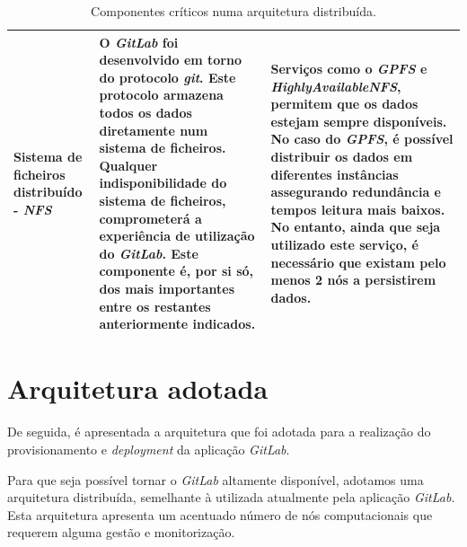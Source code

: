 \documentclass[12pt,a4paper]{article}
\begin{document}
\begin{table}[ht]
\begin{adjustbox}{width=1\textwidth}
\begin{tabular}{ | p{5cm} | p{6cm} | p{6cm} |}
        Sistema de ficheiros distribuído - \emph{NFS} & O \emph{GitLab} foi desenvolvido em torno do protocolo \emph{git}. Este protocolo armazena todos os dados diretamente num sistema de ficheiros. Qualquer indisponibilidade do sistema de ficheiros, comprometerá a experiência de utilização do \emph{GitLab}. Este componente é, por si só, dos mais importantes entre os restantes anteriormente indicados. & Serviços como o \textbf{\emph{GPFS}} e \textbf{\emph{HighlyAvailableNFS}}, permitem que os dados estejam sempre disponíveis. No caso do \emph{GPFS}, é possível distribuir os dados em diferentes instâncias assegurando redundância e tempos leitura mais baixos. No entanto, ainda que seja utilizado este serviço, é necessário que existam pelo menos 2 nós a persistirem dados.\\
        \hline
    \end{tabular}
    \end{adjustbox}
    \caption{Componentes críticos numa arquitetura distribuída.}
\end{table} 





\newpage
\section{Arquitetura adotada}

De seguida, é apresentada a arquitetura que foi adotada para a realização do provisionamento e \emph{deployment} da aplicação \emph{GitLab}.

Para que seja possível tornar o \emph{GitLab} altamente disponível, adotamos uma arquitetura distribuída, semelhante à utilizada atualmente pela aplicação \emph{GitLab}. Esta arquitetura apresenta um acentuado número de nós computacionais que requerem alguma gestão e monitorização.
\end{document}
